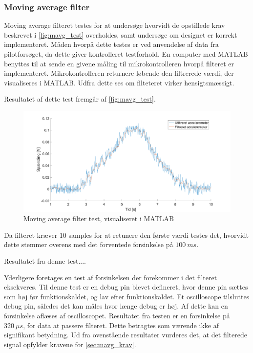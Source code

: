 \subsubsection{Moving average filter}
Moving average filteret testes for at undersøge hvorvidt de opstillede krav beskrevet i \autoref{fig:mavg_test} overholdes, samt undersøge om designet er korrekt implementeret. Måden hvorpå dette testes er ved anvendelse af data fra pilotforsøget, da dette giver kontrolleret testforhold. 
En computer med MATLAB benyttes til at sende en givene måling til mikrokontrolleren hvorpå filteret er implementeret. Mikrokontrolleren returnere løbende den filtrerede værdi, der visualiseres i MATLAB. Udfra dette ses om filteteret virker hensigtsmæssigt. 

Resultatet af dette test fremgår af \autoref{fig:mavg_test}. 

\begin{figure}[H]
	\centering
	\includegraphics[width=1\textwidth]{figures/accelerometer_filter}
	\caption{Moving average filter test, visualiseret i MATLAB}
	\label{fig:mavg_test}
\end{figure}

Da filteret kræver 10 samples for at retunere den første værdi testes det, hvorvidt dette stemmer overens med det forventede forsinkelse på $100~ms$. 

Resultatet fra denne test.... %

Yderligere foretages en test af forsinkelsen der forekommer i det filteret eksekveres. Til denne test er en debug pin blevet defineret, hvor denne pin sættes som høj før funktionskaldet, og lav efter funktionskaldet. Et oscilloscope tilsluttes debug pin, således det kan måles hvor længe debug er høj. Af dette kan en forsinkelse aflæses af oscilloscopet. 
Resultatet fra testen er en forsinkelse på $320~\mu s$, for data at passere filteret. Dette betragtes som værende ikke af signifikant betydning.    
Ud fra ovenstående resultater vurderes det, at det filterede signal opfylder kravene for \autoref{sec:mavg_krav}. 